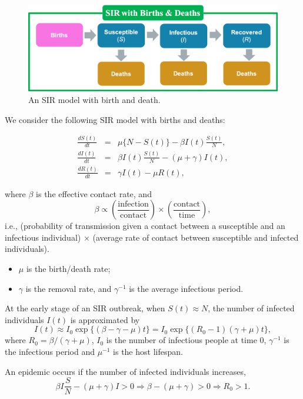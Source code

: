\documentclass[]{book}
\begin{document}
\begin{figure}

{\centering \includegraphics[width=0.75\linewidth]{figures/SIRBD} 

}

\caption{An SIR model with birth and death.}\label{fig:SIRbd}
\end{figure}

We consider the following SIR model with births and deaths:

\begin{eqnarray*}
\frac{dS(t)}{dt}& = &\mu\{N - S(t)\} - \beta I(t)\frac{S(t)}{N}, \\
\frac{dI(t)}{dt}& = &\beta I(t)\frac{S(t)}{N} - (\mu + \gamma)I(t), \\
\frac{dR(t)}{dt}& = &\gamma I(t) - \mu R(t), 
\end{eqnarray*}

where \(\beta\) is the effective contact rate, and \[
  \beta \propto \left(\frac{\mathrm{infection}}{\mathrm{contact}} \right) \times \left(\frac{\mathrm{contact}}{\mathrm{time}}\right),  
\] i.e., (probability of transmission given a contact between a
susceptible and an infectious individual) \(\times\) (average rate of
contact between susceptible and infected individuals).

\begin{itemize}
\item
  \(\mu\) is the birth/death rate;
\item
  \(\gamma\) is the removal rate, and \(\gamma^{-1}\) is the average
  infectious period.
\end{itemize}

At the early stage of an SIR outbreak, when \(S(t) \approx N\), the
number of infected individuals \(I(t)\) is approximated by \[
I(t) \approx I_0 \exp \{(\beta - \gamma - \mu) t\} = I_0 \exp \{(R_0 - 1)(\gamma + \mu)t\}, 
\] where \(R_0 = \beta/(\gamma + \mu)\), \(I_0\) is the number of
infectious people at time \(0\), \(\gamma^{-1}\) is the infectious
period and \(\mu^{-1}\) is the host lifespan.

An epidemic occurs if the number of infected individuals increases, \[
\beta I \frac{S}{N} - (\mu + \gamma)I>0 \Rightarrow \beta - (\mu + \gamma)>0 \Rightarrow  R_0>1.
\]
\end{document}

